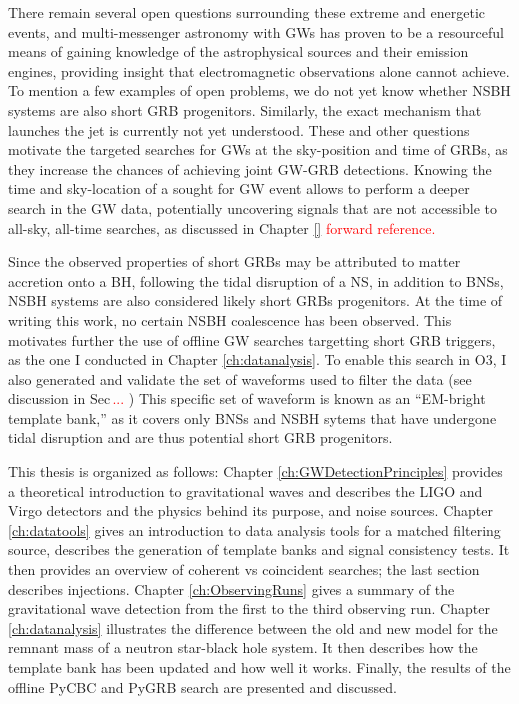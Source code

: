 \documentclass[binding=0.6cm, LaM]{sapthesis}
\newcommand{\fpg}[1]{\textcolor{red}{#1} }
\begin{document}
	There remain several open questions surrounding these extreme and energetic events, 
	and multi-messenger astronomy with GWs has proven to be a resourceful means of gaining 
	knowledge of the astrophysical sources and their emission engines, 
	providing insight that electromagnetic observations alone cannot achieve.
	To mention a few examples of open problems, we do not yet know whether NSBH systems are also short GRB progenitors.  
	Similarly, the exact mechanism that launches the jet is currently not yet understood.
        These and other questions motivate the targeted searches for GWs at the sky-position and time of GRBs, 
	as they increase the chances of achieving joint GW-GRB detections.
	Knowing the time and sky-location of a sought for GW event
	allows to perform a deeper search in the GW data, potentially uncovering signals 
	that are not accessible to all-sky, all-time searches, as discussed in Chapter \ref{} \fpg{forward reference.}

	Since the observed properties of short GRBs may be attributed to matter accretion onto a BH,
	following the tidal disruption of a NS, in addition to BNSs, NSBH systems are also considered likely short GRBs progenitors.
	At the time of writing this work, no certain NSBH coalescence has been observed.
	This motivates further the use of 
	offline GW searches targetting short GRB triggers, as the one I conducted in Chapter \ref{ch:datanalysis}.
	To enable this search in O3, I also generated and validate the set of waveforms used to filter the data (see discussion in Sec\,\fpg{...})
	This specific set of waveform is known as an ``EM-bright template bank,'' 
	as it covers only BNSs and NSBH sytems that have undergone tidal disruption and are thus potential short GRB progenitors.

	This thesis is organized as follows: Chapter \ref{ch:GWDetectionPrinciples} provides a theoretical introduction to gravitational waves and 
	describes the LIGO and Virgo detectors and the physics behind its purpose, and noise sources.
	Chapter \ref{ch:datatools} gives an introduction to data analysis tools for a matched filtering source, 
	describes the generation of template banks and signal consistency tests.
	It then provides an overview of coherent vs coincident searches; the last section describes injections.
	Chapter \ref{ch:ObservingRuns} gives a summary of the gravitational wave detection from the first to the third observing run.
	Chapter \ref{ch:datanalysis} illustrates the difference between the old and new model for the remnant mass of a neutron star-black hole system.
	It then describes how the template bank has been updated and how well it works.
	Finally, the results of the offline {\ttfamily PyCBC} and {\ttfamily PyGRB} search are presented and discussed.
\end{document}
